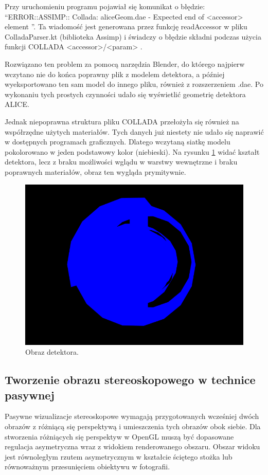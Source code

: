 Przy uruchomieniu programu pojawiał się komunikat o błędzie: \textquotedblleft ERROR::ASSIMP:: Collada: aliceGeom.dae - Expected end of <accessor> element \textquotedblright . Ta wiadomość jest generowana przez funkcję readAccessor w pliku ColladaParser.kt (biblioteka Assimp) i świadczy o błędzie składni podczas użycia funkcji COLLADA <accessor>/<param> \cite{collada}.

Rozwiązano ten problem za pomocą narzędzia Blender, do którego najpierw wczytano nie do końca poprawny plik z modelem detektora, a później wyeksportowano ten sam model do innego pliku, również z rozszerzeniem .dae. Po wykonaniu tych prostych czynności udało się wyświetlić geometrię detektora ALICE.

Jednak niepoprawna struktura pliku COLLADA przełożyła się również na współrzędne użytych materiałów. Tych danych już niestety nie udało się naprawić w dostępnych programach graficznych. Dlatego wczytaną siatkę modelu pokolorowano w jeden podstawowy kolor (niebieski). Na rysunku \ref{rys28} widać kształt detektora, lecz z braku możliwości wglądu w warstwy wewnętrzne i braku poprawnych materiałów, obraz ten wygląda prymitywnie.

\begin{figure}[H]
		\centering
 		\includegraphics[width=12.0cm]{myGeom.png}
    	\caption{Obraz detektora.}
 		\label{rys28}
\end{figure}

\subsection{Tworzenie obrazu stereoskopowego w technice pasywnej}
Pasywne wizualizacje stereoskopowe wymagają przygotowanych wcześniej dwóch obrazów z różniącą się perspektywą i umieszczenia tych obrazów obok siebie. Dla stworzenia różniących się perspektyw w OpenGL muszą być dopasowane regulacja asymetryczna wraz z widokiem renderowanego obszaru. Obszar widoku jest równoległym rzutem asymetrycznym w kształcie ściętego stożka lub równoważnym przesunięciem obiektywu w fotografii.

